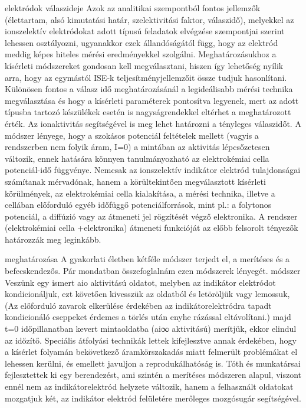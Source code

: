 { elektródok válaszideje
Azok az analitikai szempontból fontos jellemzők (élettartam, alsó kimutatási határ, szelektivitási faktor, válaszidő), melyekkel az ionszelektív elektródokat adott típusú feladatok elvégzése szempontjai szerint lehessen osztályozni, ugyanakkor ezek állandóságától függ, hogy az elektród meddig képes hiteles mérési eredményekkel szolgálni. Meghatározásukhoz a kísérleti módszereket gondosan kell megválasztani, hiszen így lehetőség nyílik arra, hogy az egymástól ISE-k teljesítményjellemzőit össze tudjuk hasonlítani. Különösen fontos a válasz idő meghatározásánál a legideálisabb mérési technika megválasztása és hogy a kísérleti paraméterek pontosítva legyenek, mert  az adott típusba tartozó készülékek esetén is nagyságrendekkel eltérhet a meghatározott érték. Az ionaktivitás segítségével is meg lehet határozni a tényleges válaszidőt. A módszer lényege, hogy a szokásos potenciál feltételek mellett (vagyis a rendszerben nem folyik áram, I=0) a mintában az aktivitás lépcsőzetesen változik, ennek hatására könnyen tanulmányozható az elektrokémiai cella potenciál-idő függvénye. Nemcsak az ionszelektív indikátor elektród tulajdonságai számítanak mérvadónak, hanem a körültekintően megválasztott kísérleti körülmények, az elektrokémiai cella kialakítása, a mérési technika, illetve a cellában előforduló egyéb időfüggő potenciálforrások, mint pl.: a folytonos potenciál, a diffúzió vagy az átmeneti jel rögzítését végző elektronika. A rendszer (elektrokémiai cella +elektronika) átmeneti funkcióját az előbb felsorolt tényezők határozzák meg leginkább. 


 meghatározása 
A gyakorlati életben kétféle módszer terjedt el, a merítéses és a befecskendezős. Pár mondatban összefoglalnám ezen módszerek lényegét. 
 módszer
Veszünk egy ismert aio aktivitású oldatot, melyben az indikátor elektródot kondicionáljuk, ezt követően kivesszük az oldatból és letöröljük vagy lemossuk, (Az előforduló zavarok elkerülése érdekében az indikátorelektródra tapadt kondicionáló cseppeket érdemes a törlés után enyhe rázással eltávolítani.) majd t=0 időpillanatban kevert mintaoldatba (ai∞ aktivitású) merítjük, ekkor elindul az időzítő. Speciális átfolyási technikák lettek kifejlesztve annak érdekében, hogy a kísérlet folyamán bekövetkező áramkörszakadás miatt felmerült problémákat el lehessen kerülni, és emellett javuljon a reprodukálhatóság is. Tóth és munkatársai fejlesztettek ki egy berendezést, ami szintén a merítéses módszeren alapul, viszont ennél nem az indikátorelektród helyzete változik, hanem a felhasznált oldatokat mozgatjuk két, az indikátor elektród felületére merőleges mozgósugár segítségével.}
